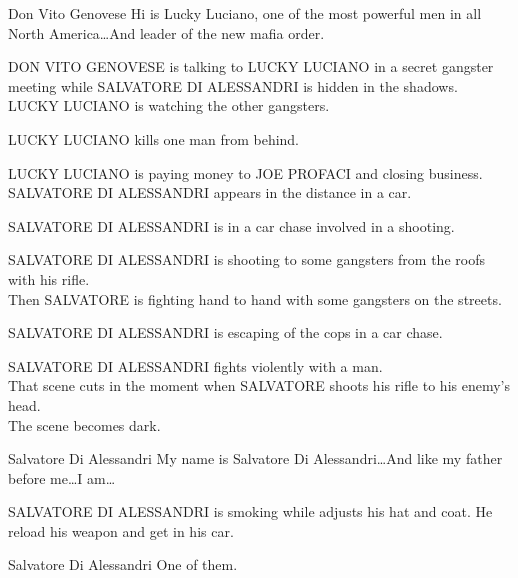 \documentclass{screenplay}[2020/03/26]
\begin{document}
\begin{dialogue}[explaining]{Don Vito Genovese}
Hi is Lucky Luciano, one of the most powerful men in all North America\dots And leader of the new mafia order.
\end{dialogue}


\fadein
{}
DON VITO GENOVESE is talking to LUCKY LUCIANO in a secret gangster meeting while SALVATORE DI ALESSANDRI is hidden in the shadows.
\\LUCKY LUCIANO is watching the other gangsters.


\fadeout
{}
LUCKY LUCIANO kills one man from behind.


\fadein
{}
LUCKY LUCIANO is paying money to JOE PROFACI and closing business.
\\SALVATORE DI ALESSANDRI appears in the distance in a car. 


\fadeout
{}
SALVATORE DI ALESSANDRI is in a car chase involved in a shooting.


\fadein
{}
SALVATORE DI ALESSANDRI is shooting to some gangsters from the roofs with his rifle.
\\Then SALVATORE is fighting hand to hand with some gangsters on the streets.


\fadeout
{}
SALVATORE DI ALESSANDRI is escaping of the cops in a car chase.


\fadein
{}
SALVATORE DI ALESSANDRI fights violently with a man.
\\That scene cuts in the moment when SALVATORE shoots his rifle to his enemy's head.
\\The scene becomes dark.

\begin{dialogue}[narrating]{Salvatore Di Alessandri}
My name is Salvatore Di Alessandri\dots And like my father before me\dots I am\dots
\end{dialogue}


\fadein
{}
SALVATORE DI ALESSANDRI is smoking while adjusts his hat and coat. He reload his weapon and get in his car.

\begin{dialogue}[narrating]{Salvatore Di Alessandri}
One of them.
\end{dialogue}

\end{document}
